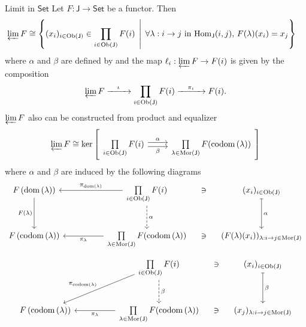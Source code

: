 \begin{example}{Limit in $\mathsf{Set}$}{}
    Let $F:\mathsf{J}\to \mathsf{Set}$ be a functor. Then
    \begin{align*}
        \varprojlim F&\cong\left\{(x_i)_{i\in \mathrm{Ob}(\mathsf{J})}\in \prod\limits_{i\in \mathrm{Ob}(\mathsf{J})}F(i)\;\,\middle\vert\, \;\forall \lambda:i\to j\text{ in }\mathrm{Hom}_\mathsf{J}(i,j),\,F(\lambda)(x_i)=x_j\right\}
    \end{align*}
    where $\alpha$ and $\beta$ are defined by 
    and the map $\ell_i:\varprojlim F\to F(i)$ is given by the composition
    \[
        \varprojlim F\xrightarrow{\quad\iota\quad}\prod\limits_{i\in \mathrm{Ob}(\mathsf{J})}F(i)\xrightarrow{\quad\pi_i\quad}F(i).
    \]
    $\varprojlim F$ also can be constructed from product and equalizer 
    \begin{align*}
        \varprojlim F\cong \ker\left[
            \begin{tikzcd}[ampersand replacement=\&]
                \prod\limits_{i\in \mathrm{Ob}(\mathsf{J})}F(i)  \arrow[r, "\alpha", shift left] \arrow[r, "\beta"', shift right] \& \prod\limits_{\lambda \in \mathrm{Mor}(\mathsf{J})}F(\mathrm{codom}\left(\lambda\right))
                \end{tikzcd}
        \right]
    \end{align*}
    where $\alpha$ and $\beta$ are induced by the following diagrams
    \[
        \begin{tikzcd}[ampersand replacement=\&]
            F\left(\mathrm{dom}\left(\lambda\right)\right) \arrow[d, "F(\lambda)"'] \&[+25pt] \prod\limits_{i\in \mathrm{Ob}(\mathsf{J})}F(i)  \arrow[l, "\pi_{\mathrm{dom}\left(\lambda\right)}"'] \arrow[d, "\alpha", dashed] \&[-15pt]\ni \& [-15pt]      (x_i)_{i\in \mathrm{Ob}(\mathsf{J})}   \arrow[d, "\alpha", mapsto]                    \\ [+10pt]
            F\left(\mathrm{codom}\left(\lambda\right)\right)        \& {\prod\limits_{\lambda \in \mathrm{Mor}(\mathsf{J})}F(\mathrm{codom}\left(\lambda\right))} \arrow[l, "{\pi_{\lambda}}"]\&\ni\& (F(\lambda)(x_i))_{\lambda:i\to j\in \mathrm{Mor}(\mathsf{J})}
            \end{tikzcd}
    \]
    \[
        \begin{tikzcd}[ampersand replacement=\&]
             \&[+25pt] \prod\limits_{i\in \mathrm{Ob}(\mathsf{J})}F(i)  \arrow[ld, "\pi_{\mathrm{codom}\left(\lambda\right)}"'] \arrow[d, "\beta", dashed]    \&[-15pt]\ni \&[-15pt]   (x_i)_{i\in \mathrm{Ob}(\mathsf{J})}   \arrow[d, "\beta", mapsto]                                 \\ [+10pt]
            F\left(\mathrm{codom}\left(\lambda\right)\right)        \& {\prod\limits_{\lambda \in \mathrm{Mor}(\mathsf{J})}F(\mathrm{codom}\left(\lambda\right))} \arrow[l, "{\pi_{\lambda}}"]\&\ni\& (x_j)_{\lambda:i\to j\in \mathrm{Mor}(\mathsf{J})}
            \end{tikzcd}
    \]
\end{example}



